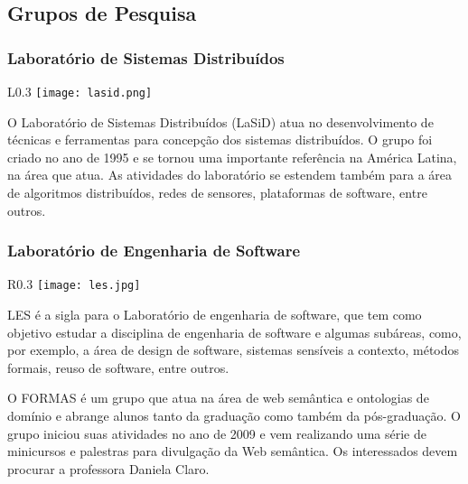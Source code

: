     \subsection{Grupos de Pesquisa}
    
        \subsubsection{Laboratório de Sistemas Distribuídos}
        
        \begin{wrapfigure}{L}{0.3\textwidth}
            \centering
            \texttt{[image: lasid.png]}
        \end{wrapfigure}
        O Laboratório de Sistemas Distribuídos (LaSiD) atua no desenvolvimento de técnicas e ferramentas para concepção dos sistemas distribuídos. O grupo foi criado no ano de 1995 e se tornou uma importante referência na América Latina, na área que atua. As atividades do laboratório se estendem também para a área de algoritmos distribuídos, redes de sensores, plataformas de software, entre outros.
        
        \subsubsection{Laboratório de Engenharia de Software}
        
        \begin{wrapfigure}{R}{0.3\textwidth}
            \centering
            \texttt{[image: les.jpg]}
        \end{wrapfigure}
        \par LES é a sigla para o Laboratório de engenharia de software, que tem como objetivo estudar a disciplina de engenharia de software e algumas subáreas, como, por exemplo, a área de design de software, sistemas sensíveis a contexto, métodos formais, reuso de software, entre outros. 
        
        \par O FORMAS é um grupo que atua na área de web semântica e ontologias de domínio e abrange alunos tanto da graduação como também da pós-graduação. O grupo iniciou suas atividades no ano de 2009 e vem realizando uma série de minicursos e palestras para divulgação da Web semântica. Os interessados devem procurar a professora Daniela Claro.
     
